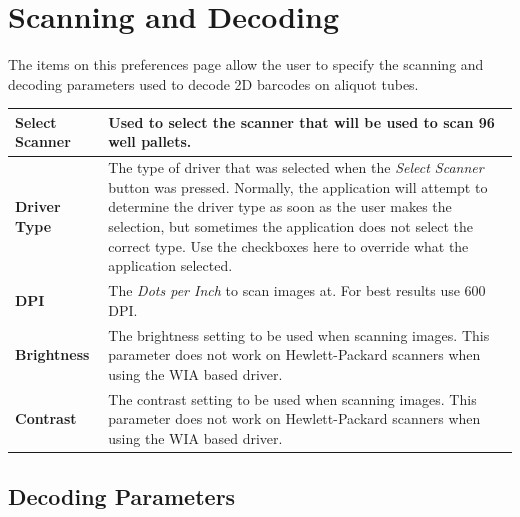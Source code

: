 \section{Scanning and Decoding}
The items on this preferences page allow the user to specify the scanning and
decoding parameters used to decode 2D barcodes on aliquot tubes.
\begin{center}
\begin{tabular}{|l|p{5in}|}
  \hline
  \textbf{Select Scanner} & Used to select the scanner that will be used to scan
    96 well pallets.\\
  \hline
  \textbf{Driver Type} & The type of driver that was selected when the \emph{Select
    Scanner} button was pressed. Normally, the application will attempt to
    determine the driver type as soon as the user makes the selection, but
    sometimes the application does not select the correct type. Use the
    checkboxes here to override what the application selected.\\
  \hline
  \textbf{DPI} & The \emph{Dots per Inch} to scan images at. For best results use
    600 DPI.\\
  \hline
  \textbf{Brightness} & The brightness setting to be used when scanning
    images. This parameter does not work on Hewlett-Packard scanners when using
    the WIA based driver.\\
  \hline
  \textbf{Contrast} & The contrast setting to be used when scanning
    images. This parameter does not work on Hewlett-Packard scanners when using
    the WIA based driver.\\
  \hline
\end{tabular}
\end{center}
\subsection{Decoding Parameters}

